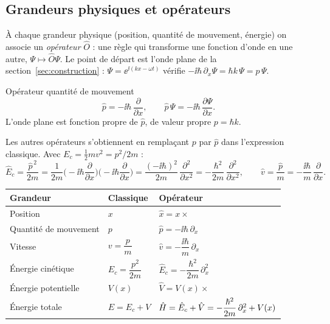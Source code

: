 \subsection{Grandeurs physiques et opérateurs}\label{sec:operateurs}

À chaque grandeur physique (position, quantité de mouvement, énergie) on associe
un \emph{opérateur} $\hat O$ : une règle qui transforme une fonction d'onde en une
autre, $\Psi\mapsto\hat O\Psi$. Le point de départ est l'onde plane de la
section~\ref{sec:construction} : $\Psi=\ee^{\ii(kx-\omega t)}$ vérifie
$-\ii\hbar\,\partial_x\Psi=\hbar k\,\Psi=p\,\Psi$.

\begin{definition}{Opérateur quantité de mouvement}
\[
  \hat p = -\ii\hbar\,\frac{\partial}{\partial x},
  \qquad
  \hat p\,\Psi = -\ii\hbar\,\frac{\partial\Psi}{\partial x}.
\]
L'onde plane est fonction propre de $\hat p$, de valeur propre $p=\hbar k$.
\end{definition}

Les autres opérateurs s'obtiennent en remplaçant $p$ par $\hat p$ dans
l'expression classique. Avec $E_c=\tfrac12 mv^2=p^2/2m$ :
\[
  \hat E_c = \frac{\hat p^{\,2}}{2m}
  = \frac{1}{2m}\Big(-\ii\hbar\frac{\partial}{\partial x}\Big)
                \Big(-\ii\hbar\frac{\partial}{\partial x}\Big)
  = \frac{(-\ii\hbar)^2}{2m}\,\frac{\partial^2}{\partial x^2}
  = -\frac{\hbar^2}{2m}\,\frac{\partial^2}{\partial x^2},
  \qquad
  \hat v = \frac{\hat p}{m} = -\frac{\ii\hbar}{m}\,\frac{\partial}{\partial x}.
\]

\begin{center}
\renewcommand{\arraystretch}{1.6}
\begin{tabular}{@{}lll@{}}
\toprule
\textbf{Grandeur} & \textbf{Classique} & \textbf{Opérateur} \\
\midrule
Position & $x$ & $\hat x = x\times$ \\
Quantité de mouvement & $p$ & $\hat p = -\ii\hbar\,\partial_x$ \\
Vitesse & $v=\dfrac{p}{m}$ & $\hat v = -\dfrac{\ii\hbar}{m}\,\partial_x$ \\
Énergie cinétique & $E_c=\dfrac{p^2}{2m}$ & $\hat E_c = -\dfrac{\hbar^2}{2m}\,\partial_x^2$ \\
Énergie potentielle & $V(x)$ & $\hat V = V(x)\times$ \\
Énergie totale & $E=E_c+V$ & $\hat{H} = \hat E_c+\hat V = -\dfrac{\hbar^2}{2m}\,\partial_x^2+V(x)$ \\
\bottomrule
\end{tabular}
\end{center}

